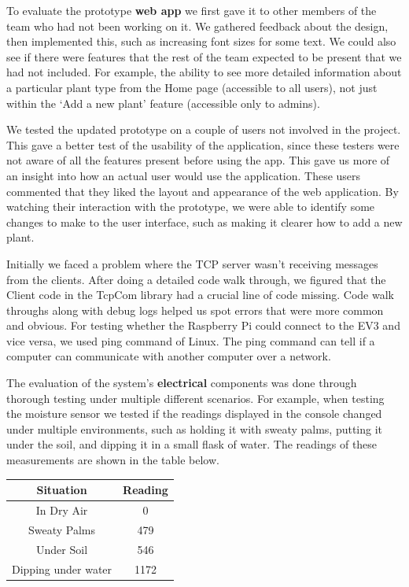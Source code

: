 \documentclass{article}
\begin{document}
To evaluate the prototype \textbf{web app} we first gave it to other members of the team who had not been working on it. We gathered feedback about the design, then implemented this, such as increasing font sizes for some text. We could also see if there were features that the rest of the team expected to be present that we had not included. For example, the ability to see more detailed information about a particular plant type from the Home page (accessible to all users), not just within the ‘Add a new plant’ feature (accessible only to admins).

We tested the updated prototype on a couple of users not involved in the project. This gave a better test of the usability of the application, since these testers were not aware of all the features present before using the app. This gave us more of an insight into how an actual user would use the application. These users commented that they liked the layout and appearance of the web application. By watching their interaction with the prototype, we were able to identify some changes to make to the user interface, such as making it clearer how to add a new plant.

Initially we faced a problem where the TCP server wasn't receiving messages from the clients. After doing a detailed code walk through, we figured that the Client code in the TcpCom library had a crucial line of code missing. Code walk throughs along with debug logs helped us spot errors that were more common and obvious. For testing whether the Raspberry Pi could connect to the EV3 and vice versa,  we used ping command of Linux. The ping command can tell if a computer can communicate with another computer over a network.

The evaluation of the system's \textbf{electrical} components was done through thorough testing under multiple different scenarios. For example, when testing the moisture sensor we tested if the readings displayed in the console changed under multiple environments, such as holding it with sweaty palms, putting it under the soil, and dipping it in a small flask of water. The readings of these measurements are shown in the table below. 

\begin{center}
 \begin{tabular}{||c c||} 
 \hline
 Situation & Reading \\ [0.5ex] 
 \hline
 In Dry Air & 0 \\ 
 \hline
 Sweaty Palms & 479 \\
 \hline
 Under Soil & 546 \\
 \hline
 Dipping under water & 1172 \\ [1ex]
 \hline
\end{tabular}
\end{center}
\end{document}
